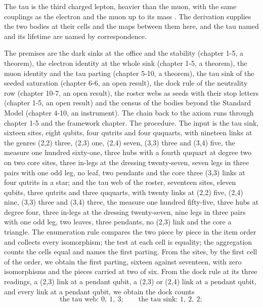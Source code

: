 \begin{chbridge}
The tau is the third charged lepton, heavier than the muon, with the same couplings as the electron and the muon up to its mass \cite{Perl1975}. The derivation supplies the two bodies at their cells and the maps between them here, and the tau named and its lifetime are named by correspondence.
\end{chbridge}
\begin{chproof}
The premises are the dark sinks at the office and the stability (chapter 1-5, a theorem), the electron identity at the whole sink (chapter 1-5, a theorem), the muon identity and the tau parting (chapter 5-10, a theorem), the tau sink of the seeded saturation (chapter 6-6, an open result), the dock rule of the neutrality row (chapter 10-7, an open result), the roster webs as seeds with their stop letters (chapter 1-5, an open result) and the census of the bodies beyond the Standard Model (chapter 4-10, an instrument). The chain back to the axiom runs through chapter 1-5 and the framework chapter. The procedure. The input is the tau sink, sixteen sites, eight qubits, four qutrits and four ququarts, with nineteen links at the genres (2,2) three, (2,3) one, (2,4) seven, (3,3) three and (3,4) five, the measure one hundred sixty-one, three hubs with a fourth ququart at degree two on two core sites, three in-legs at the dressing twenty-seven, seven legs in three pairs with one odd leg, no leaf, two pendants and the core three (3,3) links at four qutrits in a star; and the tau web of the roster, seventeen sites, eleven qubits, three qutrits and three ququarts, with twenty links at (2,2) five, (2,4) nine, (3,3) three and (3,4) three, the measure one hundred fifty-five, three hubs at degree four, three in-legs at the dressing twenty-seven, nine legs in three pairs with one odd leg, two leaves, three pendants, no (2,3) link and the core a triangle. The enumeration rule compares the two piece by piece in the item order and collects every isomorphism; the test at each cell is equality; the aggregation counts the cells equal and names the first parting. From the sites, by the first cell of the order, we obtain the first parting, sixteen against seventeen, with zero isomorphisms and the pieces carried at two of six. From the dock rule at its three readings, a (2,3) link at a pendant qubit, a (2,3) or (2,4) link at a pendant qubit, and every link at a pendant qubit, we obtain the dock counts
\begin{equation}
\text{the tau web: } 0,\ 1,\ 3 ; \qquad \text{the tau sink: } 1,\ 2,\ 2 ;

\end{equation}
\end{chproof}

